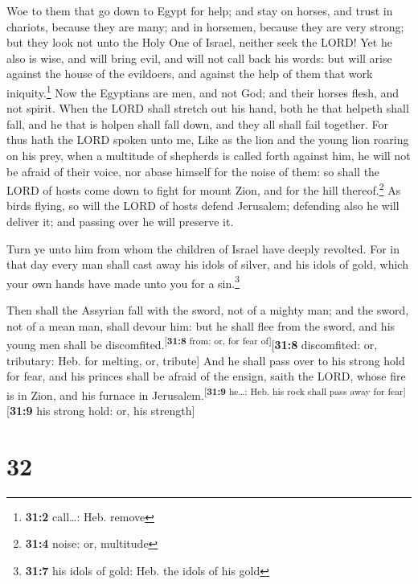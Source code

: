  Woe to them that go down to Egypt for help; and stay on
horses, and trust in chariots, because they are many; and in horsemen,
because they are very strong; but they look not unto the Holy One of
Israel, neither seek the LORD!  Yet he also is wise, and
will bring evil, and will not call back his words: but will arise
against the house of the evildoers, and against the help of them that
work iniquity.\footnote{\textbf{31:2} call\ldots: Heb. remove}
 Now the Egyptians are men, and not God; and their horses
flesh, and not spirit. When the LORD shall stretch out his hand, both he
that helpeth shall fall, and he that is holpen shall fall down, and they
all shall fail together.  For thus hath the LORD spoken
unto me, Like as the lion and the young lion roaring on his prey, when a
multitude of shepherds is called forth against him, he will not be
afraid of their voice, nor abase himself for the noise of them: so shall
the LORD of hosts come down to fight for mount Zion, and for the hill
thereof.\footnote{\textbf{31:4} noise: or, multitude}  As
birds flying, so will the LORD of hosts defend Jerusalem; defending also
he will deliver it; and passing over he will preserve it.

 Turn ye unto him from whom the children of Israel have
deeply revolted.  For in that day every man shall cast
away his idols of silver, and his idols of gold, which your own hands
have made unto you for a sin.\footnote{\textbf{31:7} his idols of gold:
  Heb. the idols of his gold}

 Then shall the Assyrian fall with the sword, not of a
mighty man; and the sword, not of a mean man, shall devour him: but he
shall flee from the sword, and his young men shall be
discomfited.\textsuperscript{{[}\textbf{31:8} from: or, for fear
of{]}}{[}\textbf{31:8} discomfited: or, tributary: Heb. for melting, or,
tribute{]}  And he shall pass over to his strong hold for
fear, and his princes shall be afraid of the ensign, saith the LORD,
whose fire is in Zion, and his furnace in
Jerusalem.\textsuperscript{{[}\textbf{31:9} he\ldots: Heb. his rock
shall pass away for fear{]}}{[}\textbf{31:9} his strong hold: or, his
strength{]}

\hypertarget{section-31}{%
\section{32}\label{section-31}}

